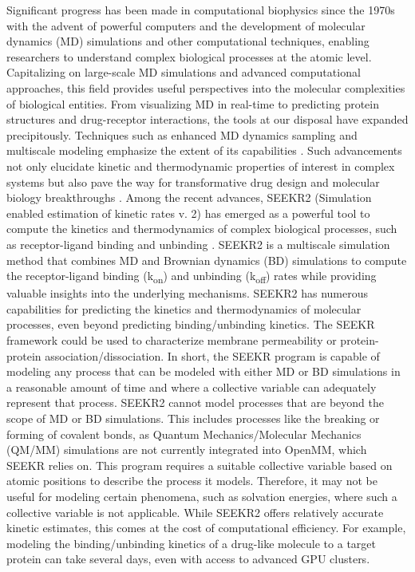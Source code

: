 \documentclass[9pt,training,pubversion]{livecoms}
\begin{document}
Significant progress has been made in computational biophysics since the 1970s with the advent of powerful computers and the development of molecular dynamics (MD) simulations and other computational techniques, enabling researchers to understand complex biological processes at the atomic level. Capitalizing on large-scale MD simulations and advanced computational approaches, this field provides useful perspectives into the molecular complexities of biological entities. From visualizing MD in real-time to predicting protein structures and drug-receptor interactions, the tools at our disposal have expanded precipitously. Techniques such as enhanced MD dynamics sampling and multiscale modeling emphasize the extent of its capabilities \cite{amaro2018multiscale, jagger2020predicting, ojha2022selectivity, zuckerman2017weighted, miao2015gaussian, kokh2020workflow, ojha2023deepwest, ahn2021gaussian}. Such advancements not only elucidate kinetic and thermodynamic properties of interest in complex systems but also pave the way for transformative drug design and molecular biology breakthroughs \cite{amaro2018multiscale, lee2018exascale}. Among the recent advances, SEEKR2 (Simulation enabled estimation of kinetic rates v. 2) has emerged as a powerful tool to compute the kinetics and thermodynamics of complex biological processes, such as receptor-ligand binding and unbinding \cite{votapka2017seekr, jagger2018seekr, votapka2022seekr2, jagger2018quantitative, ahn2020ranking}. SEEKR2 is a multiscale simulation method that combines MD and Brownian dynamics (BD) simulations to compute the receptor-ligand binding (k\textsubscript{on}) and unbinding (k\textsubscript{off}) rates while providing valuable insights into the underlying mechanisms. SEEKR2 has numerous capabilities for predicting the kinetics and thermodynamics of molecular processes, even beyond predicting binding/unbinding kinetics. The SEEKR framework could be used to characterize membrane permeability or protein-protein association/dissociation. In short, the SEEKR program is capable of modeling any process that can be modeled with either MD or BD simulations in a reasonable amount of time and where a collective variable can adequately represent that process. SEEKR2 cannot model processes that are beyond the scope of MD or BD simulations. This includes processes like the breaking or forming of covalent bonds, as Quantum Mechanics/Molecular Mechanics (QM/MM) simulations are not currently integrated into OpenMM, which SEEKR relies on. This program requires a suitable collective variable based on atomic positions to describe the process it models. Therefore, it may not be useful for modeling certain phenomena, such as solvation energies, where such a collective variable is not applicable. While SEEKR2 offers relatively accurate kinetic estimates, this comes at the cost of computational efficiency. For example, modeling the binding/unbinding kinetics of a drug-like molecule to a target protein can take several days, even with access to advanced GPU clusters. \par 
\end{document}
